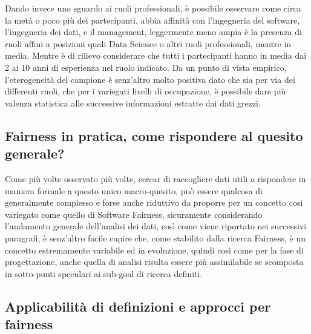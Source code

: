     Dando invece uno sguardo ai ruoli professionali, è possibile osservare come circa la metà o poco più dei partecipanti, abbia affinità con l'ingegneria del software, l'ingegneria dei dati, e il management, leggermente meno ampia è la presenza di ruoli affini a posizioni quali Data Science o altri ruoli professionali, mentre in media. Mentre è di rilievo considerare che tutti i partecipanti hanno in media dai 2 ai 10 anni di esperienza nel ruolo indicato. Da un punto di vista empirico, l'eterogeneità del campione è senz'altro molto positiva dato che sia per via dei differenti ruoli, che per i variegati livelli di occupazione, è possibile dare più valenza statistica alle successive informazioni estratte dai dati grezzi.
    
    \subsection{Fairness in pratica, come rispondere al quesito generale?}
    
    
    \begin{center}
		\hspace*{-5mm}%
	\end{center}
	
	Come più volte osservato più volte, cercar di raccogliere dati utili a rispondere in maniera formale a questo unico macro-quesito, può essere qualcosa di generalmente complesso e forse anche riduttivo da proporre per un concetto così variegato come quello di Software Fairness, sicuramente considerando l'andamento generale dell'analisi dei dati, così come viene riportato nei successivi paragrafi, è senz'altro facile capire che, come stabilito dalla ricerca Fairness, è un concetto estremamente variabile ed in evoluzione, quindi così come per la fase di progettazione, anche quella di analisi risulta essere più assimilabile se scomposta in sotto-punti speculari ai sub-goal di ricerca definiti. 
    
    \subsection{Applicabilità di definizioni e approcci per fairness}
    

